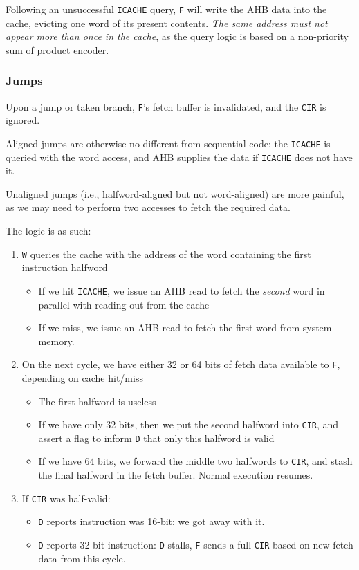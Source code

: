 \documentclass{article}
\begin{document}
Following an unsuccessful \texttt{ICACHE} query, \texttt{F} will write the AHB data into the cache, evicting one word of its present contents. \textit{The same address must not appear more than once in the cache}, as the query logic is based on a non-priority sum of product encoder.


\subsubsection{Jumps}
\label{section:jumps}

Upon a jump or taken branch, \texttt{F}'s fetch buffer is invalidated, and the \texttt{CIR} is ignored.

Aligned jumps are otherwise no different from sequential code: the \texttt{ICACHE} is queried with the word access, and AHB supplies the data if \texttt{ICACHE} does not have it.

Unaligned jumps (i.e., halfword-aligned but not word-aligned) are more painful, as we may need to perform two accesses to fetch the required data.

The logic is as such:

\begin{enumerate}
	\item \texttt{W} queries the cache with the address of the word containing the first instruction halfword
	\begin{itemize}
		\item If we hit \texttt{ICACHE}, we issue an AHB read to fetch the \textit{second} word in parallel with reading out from the cache
		\item If we miss, we issue an AHB read to fetch the first word from system memory.
	\end{itemize}
	\item On the next cycle, we have either 32 or 64 bits of fetch data available to \texttt{F}, depending on cache hit/miss
	\begin{itemize}
		\item The first halfword is useless
		\item If we have only 32 bits, then we put the second halfword into \texttt{CIR}, and assert a flag to inform \texttt{D} that only this halfword is valid
		\item If we have 64 bits, we forward the middle two halfwords to \texttt{CIR}, and stash the final halfword in the fetch buffer. Normal execution resumes.
	\end{itemize}
	\item If \texttt{CIR} was half-valid:
		\begin{itemize}
			\item \texttt{D} reports instruction was 16-bit: we got away with it.
			\item \texttt{D} reports 32-bit instruction: \texttt{D} stalls, \texttt{F} sends a full \texttt{CIR} based on new fetch data from this cycle.
		\end{itemize}
\end{enumerate}
\end{document}

